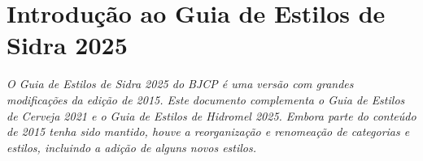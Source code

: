 \section*{Introdução ao Guia de Estilos de Sidra 2025}

\textit{O Guia de Estilos de Sidra 2025 do BJCP é uma versão com grandes modificações da edição de 2015. Este documento complementa o Guia de Estilos de Cerveja 2021 e o Guia de Estilos de Hidromel 2025. Embora parte do conteúdo de 2015 tenha sido mantido, houve a reorganização e renomeação de categorias e estilos, incluindo a adição de alguns novos estilos.}
